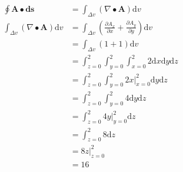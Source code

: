 \documentclass{article}
\begin{document}
\begin{equation*}
	\begin{split}
		\oint \mathbf{A} \bullet \mathbf{ds} & = \int_{\Delta v} (\nabla \bullet \mathbf{A}) \text{d}v \\
		\int_{\Delta v} (\nabla \bullet \mathbf{A}) \text{d}v & = \int_{\Delta v} \left( \frac{\partial A_x}{\partial x} + \frac{\partial A_y}{\partial y} \right) \text{d}v \\
		& = \int_{\Delta v} (1 + 1)\text{d}v \\
		& = \int_{z=0}^2 \int_{y=0}^2 \int_{x=0}^2 2 \text{d}x \text{d}y \text{d}z \\
		& = \int_{z=0}^2 \int_{y=0}^2 2x\rvert_{x=0}^2 \text{d}y \text{d}z \\
		& = \int_{z=0}^2 \int_{y=0}^2 4 \text{d}y \text{d}z \\
		& = \int_{z=0}^2 4y\rvert_{y=0}^2 \text{d}z \\
		& = \int_{z=0}^2 8 \text{d}z \\
		& = 8z\rvert_{z=0}^2 \\
		& = 16
	\end{split}
\end{equation*}
\end{document}
